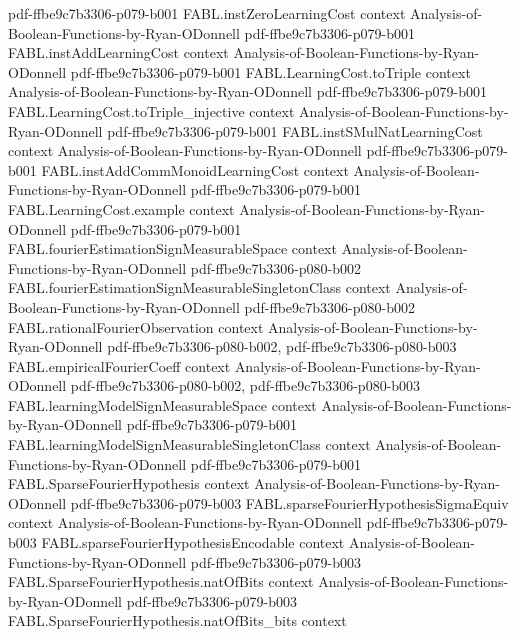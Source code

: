 \begin{theorem}
  {pdf-ffbe9c7b3306-p079-b001}
\proofstep
  {FABL.instZeroLearningCost}
  {context}
  {Analysis-of-Boolean-Functions-by-Ryan-ODonnell}
  {pdf-ffbe9c7b3306-p079-b001}
\proofstep
  {FABL.instAddLearningCost}
  {context}
  {Analysis-of-Boolean-Functions-by-Ryan-ODonnell}
  {pdf-ffbe9c7b3306-p079-b001}
\proofstep
  {FABL.LearningCost.toTriple}
  {context}
  {Analysis-of-Boolean-Functions-by-Ryan-ODonnell}
  {pdf-ffbe9c7b3306-p079-b001}
\proofstep
  {FABL.LearningCost.toTriple_injective}
  {context}
  {Analysis-of-Boolean-Functions-by-Ryan-ODonnell}
  {pdf-ffbe9c7b3306-p079-b001}
\proofstep
  {FABL.instSMulNatLearningCost}
  {context}
  {Analysis-of-Boolean-Functions-by-Ryan-ODonnell}
  {pdf-ffbe9c7b3306-p079-b001}
\proofstep
  {FABL.instAddCommMonoidLearningCost}
  {context}
  {Analysis-of-Boolean-Functions-by-Ryan-ODonnell}
  {pdf-ffbe9c7b3306-p079-b001}
\proofstep
  {FABL.LearningCost.example}
  {context}
  {Analysis-of-Boolean-Functions-by-Ryan-ODonnell}
  {pdf-ffbe9c7b3306-p079-b001}
\proofstep
  {FABL.fourierEstimationSignMeasurableSpace}
  {context}
  {Analysis-of-Boolean-Functions-by-Ryan-ODonnell}
  {pdf-ffbe9c7b3306-p080-b002}
\proofstep
  {FABL.fourierEstimationSignMeasurableSingletonClass}
  {context}
  {Analysis-of-Boolean-Functions-by-Ryan-ODonnell}
  {pdf-ffbe9c7b3306-p080-b002}
\proofstep
  {FABL.rationalFourierObservation}
  {context}
  {Analysis-of-Boolean-Functions-by-Ryan-ODonnell}
  {pdf-ffbe9c7b3306-p080-b002,
    pdf-ffbe9c7b3306-p080-b003}
\proofstep
  {FABL.empiricalFourierCoeff}
  {context}
  {Analysis-of-Boolean-Functions-by-Ryan-ODonnell}
  {pdf-ffbe9c7b3306-p080-b002,
    pdf-ffbe9c7b3306-p080-b003}
\proofstep
  {FABL.learningModelSignMeasurableSpace}
  {context}
  {Analysis-of-Boolean-Functions-by-Ryan-ODonnell}
  {pdf-ffbe9c7b3306-p079-b001}
\proofstep
  {FABL.learningModelSignMeasurableSingletonClass}
  {context}
  {Analysis-of-Boolean-Functions-by-Ryan-ODonnell}
  {pdf-ffbe9c7b3306-p079-b001}
\proofstep
  {FABL.SparseFourierHypothesis}
  {context}
  {Analysis-of-Boolean-Functions-by-Ryan-ODonnell}
  {pdf-ffbe9c7b3306-p079-b003}
\proofstep
  {FABL.sparseFourierHypothesisSigmaEquiv}
  {context}
  {Analysis-of-Boolean-Functions-by-Ryan-ODonnell}
  {pdf-ffbe9c7b3306-p079-b003}
\proofstep
  {FABL.sparseFourierHypothesisEncodable}
  {context}
  {Analysis-of-Boolean-Functions-by-Ryan-ODonnell}
  {pdf-ffbe9c7b3306-p079-b003}
\proofstep
  {FABL.SparseFourierHypothesis.natOfBits}
  {context}
  {Analysis-of-Boolean-Functions-by-Ryan-ODonnell}
  {pdf-ffbe9c7b3306-p079-b003}
\proofstep
  {FABL.SparseFourierHypothesis.natOfBits_bits}
  {context}

\end{theorem}

